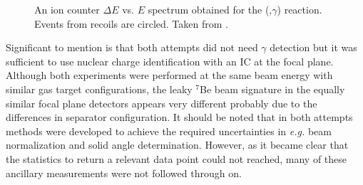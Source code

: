 \begin{figure}
\begin{center}
\caption{An ion counter $\Delta{}E$ vs. $E$ spectrum obtained for the (,$\gamma$) reaction. Events from  recoils are circled. Taken from \cite{bard09}.}
\label{fig:bardayan09_fig4}
\end{center}
\end{figure}%
Significant to mention is that both attempts did not need $\gamma$ detection but it was sufficient to use nuclear charge identification with an IC at the focal plane. Although both experiments were performed at the same beam energy with similar gas target configurations, the leaky $^7$Be beam signature in the equally similar focal plane detectors appears very different probably due to the differences in separator configuration. It should be noted that in both attempts methods were developed to achieve the required uncertainties in {\it e.g.} beam normalization and solid angle determination. However, as it became clear that the statistics to return a relevant data point could not reached, many of these ancillary measurements were not followed through on. 


